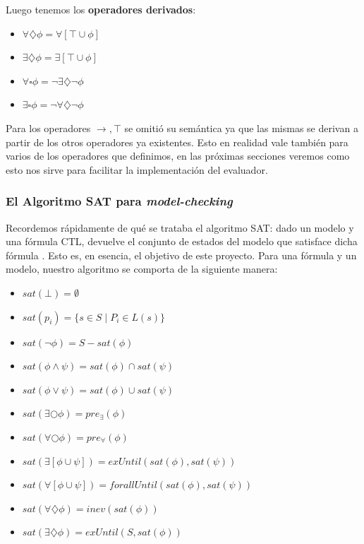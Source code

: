 \documentclass[11pt]{article}
\begin{document}
Luego tenemos los \textbf{operadores derivados}:

\begin{itemize}
  \item $\forall \diamondsuit \phi = \forall [\top \cup \phi]  $
  \item $\exists \diamondsuit \phi = \exists [\top \cup \phi] $
  \item $\forall \square \phi = \neg \exists \diamondsuit \neg \phi $
  \item $\exists \square \phi = \neg \forall \diamondsuit \neg \phi $
\end{itemize}

Para los operadores $\rightarrow, \top$ se omitió su semántica ya que las mismas
se derivan a partir de los otros operadores ya existentes. Esto en realidad vale
también para varios de los operadores que definimos, en las próximas secciones
veremos como esto nos sirve para facilitar la implementación del evaluador.

\subsubsection{El Algoritmo SAT para \emph{model-checking}}

Recordemos rápidamente de qué se trataba el algoritmo SAT: dado un modelo y una 
fórmula CTL, devuelve el conjunto de estados del modelo que satisface dicha 
fórmula \cite{theory}. Esto es, en esencia, el objetivo de este proyecto. Para una fórmula
y un modelo, nuestro algoritmo se comporta de la siguiente manera:

\begin{itemize}
  \item $sat(\bot) = \emptyset$
  \item $sat(p_i) = \{s \in S \; | \; P_i \in L(s) \}$
  \item $sat(\neg \phi) = S - sat(\phi)$
  \item $sat(\phi \land \psi) = sat(\phi) \cap sat(\psi)$
  \item $sat(\phi \lor \psi) = sat(\phi) \cup sat(\psi)$
  \item $sat(\exists \bigcirc \phi) = pre_{\exists}(\phi)$
  \item $sat(\forall \bigcirc \phi) = pre_{\forall}(\phi)$
  \item $sat(\exists [\phi \cup \psi]) = exUntil(sat(\phi), sat(\psi))$
  \item $sat(\forall [\phi \cup \psi]) = forallUntil(sat(\phi), sat(\psi))$
  \item $sat(\forall \diamondsuit \phi) = inev(sat(\phi))$
  \item $sat(\exists \diamondsuit \phi) = exUntil(S, sat(\phi))$
\end{itemize}
\end{document}
